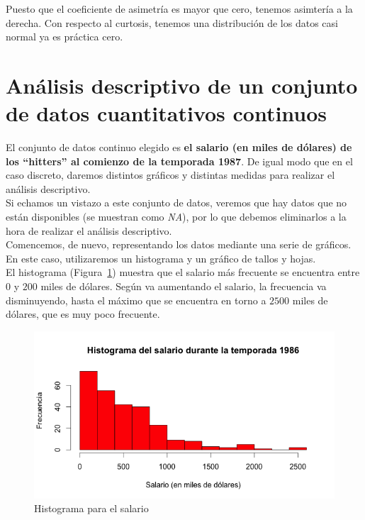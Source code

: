 \documentclass[12pt,a4paper,twoside,openright,titlepage,final]{article}
\begin{document}
Puesto que el coeficiente de asimetría es mayor que cero, tenemos asimtería a la derecha. Con respecto al curtosis, tenemos una distribución de los datos casi normal ya es práctica cero.

\newpage 

\section{Análisis descriptivo de un conjunto de datos cuantitativos continuos}

El conjunto de datos continuo elegido es \textbf{el salario (en miles de dólares) de los ``hitters'' al comienzo de la temporada 1987}. De igual modo que en el caso discreto, daremos distintos gráficos y distintas medidas para realizar el análisis descriptivo.\\

Si echamos un vistazo a este conjunto de datos, veremos que hay datos que no están disponibles (se muestran como \textit{NA}), por lo que debemos eliminarlos a la hora de realizar el análisis descriptivo.\\

Comencemos, de nuevo, representando los datos mediante una serie de gráficos. En este caso, utilizaremos un histograma y un gráfico de tallos y hojas.\\

El histograma (Figura~\ref{fig:histograma_salario}) muestra que el salario más frecuente se encuentra entre $0$ y $200$ miles de dólares. Según va aumentando el salario, la frecuencia va disminuyendo, hasta el máximo que se encuentra en torno a $2500$ miles de dólares, que es muy poco frecuente.\\ 

\begin{figure}[tbph!]
\centering
\includegraphics[width=0.8\linewidth]{imagenes/histograma_salario}
\caption{Histograma para el salario}
\label{fig:histograma_salario}
\end{figure}
\end{document}
